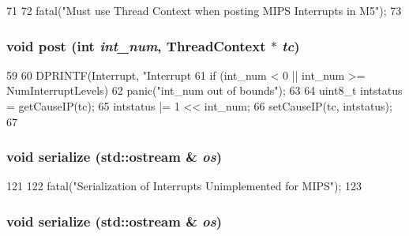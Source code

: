 \begin{DoxyCode}
71 {
72     fatal("Must use Thread Context when posting MIPS Interrupts in M5");
73 }
\end{DoxyCode}
\hypertarget{classMipsISA_1_1Interrupts_a03cb6c87689ac9000f54a7eacfa2c730}{
\subsubsection[{post}]{\setlength{\rightskip}{0pt plus 5cm}void post (int {\em int\_\-num}, \/  {\bf ThreadContext} $\ast$ {\em tc})}}
\label{classMipsISA_1_1Interrupts_a03cb6c87689ac9000f54a7eacfa2c730}



\begin{DoxyCode}
59 {
60     DPRINTF(Interrupt, "Interrupt %
61     if (int_num < 0 || int_num >= NumInterruptLevels)
62         panic("int_num out of bounds\n");
63 
64     uint8_t intstatus = getCauseIP(tc);
65     intstatus |= 1 << int_num;
66     setCauseIP(tc, intstatus);
67 }
\end{DoxyCode}
\hypertarget{classMipsISA_1_1Interrupts_a53e036786d17361be4c7320d39c99b84}{
\subsubsection[{serialize}]{\setlength{\rightskip}{0pt plus 5cm}void serialize (std::ostream \& {\em os})}}
\label{classMipsISA_1_1Interrupts_a53e036786d17361be4c7320d39c99b84}



\begin{DoxyCode}
121     {
122         fatal("Serialization of Interrupts Unimplemented for MIPS");
123     }
\end{DoxyCode}
\hypertarget{classMipsISA_1_1Interrupts_a53e036786d17361be4c7320d39c99b84}{
\subsubsection[{serialize}]{\setlength{\rightskip}{0pt plus 5cm}void serialize (std::ostream \& {\em os})}}
\label{classMipsISA_1_1Interrupts_a53e036786d17361be4c7320d39c99b84}



